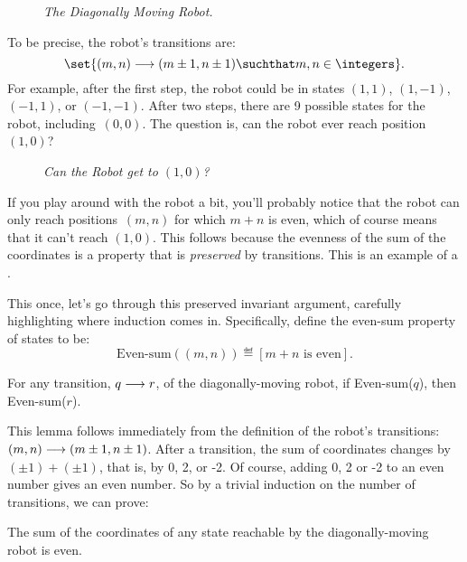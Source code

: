 \begin{figure}
\caption{\em The Diagonally Moving Robot.}
\label{fig:diagrobot}
\end{figure}

To be precise, the robot's transitions are:
\[
\set{(m,n)\movesto (m\pm 1, n\pm 1) \suchthat m,n \in \integers}.
\]
For example, after the first step, the robot could be in states $(1,
1)$, $(1, -1)$, $(-1, 1)$, or $(-1, -1)$.  After two steps, there are
9 possible states for the robot, including~$(0, 0)$.
The question is, can the robot ever reach position~$(1, 0)$?

\begin{figure}
\caption{\em Can the Robot get to $(1,0)$?}
\label{fig:robot-to10}
\end{figure}

If you play around with the robot a bit, you'll probably notice that
the robot can only reach positions~$(m, n)$ for which $m + n$ is even,
which of course means that it can't reach $(1,0)$.  This follows
because the evenness of the sum of the coordinates is a property that
is \emph{preserved} by transitions.  This is an example of a
.

This once, let's go through this preserved invariant argument,
carefully highlighting where induction comes in.  Specifically, define
the even-sum property of states to be:
\[
\text{Even-sum}((m,n)) \eqdef [m+n \text{ is even}].
\]
\begin{lemma}\label{even-sum-invar}
For any transition, $q \mathrel{\longrightarrow} r$, of the diagonally-moving robot, if
Even-sum($q$), then Even-sum($r$).
\end{lemma}
This lemma follows immediately from the definition of the robot's
transitions: $(m,n)\mathrel{\longrightarrow} (m\pm 1, n\pm 1)$.  After a transition,
the sum of coordinates changes by $(\pm 1) + (\pm 1)$, that is, by 0,
2, or -2.  Of course, adding 0, 2 or -2 to an even number gives an
even number.  So by a trivial induction on the number of transitions,
we can prove:
\begin{theorem}\label{th:diag-robot}
The sum of the coordinates of any state reachable by the
diagonally-moving robot is even.
\end{theorem}

